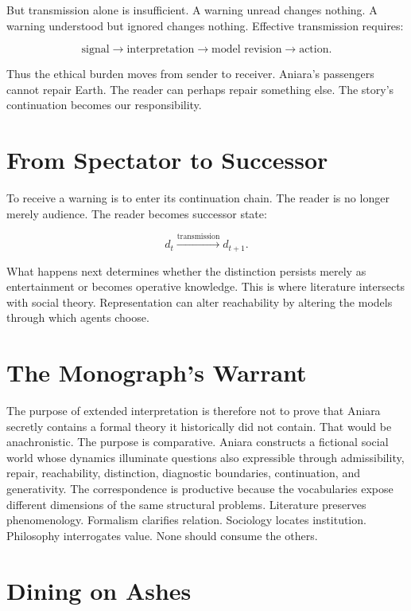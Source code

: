\documentclass[11pt,oneside]{book}
\theoremstyle{definition}
\theoremstyle{remark}
\begin{document}
But transmission alone is insufficient. A warning unread changes nothing. A warning understood but
ignored changes nothing. Effective transmission requires:

\[
\text{signal} \rightarrow \text{interpretation} \rightarrow \text{model revision} \rightarrow \text{action}.
\]

Thus the ethical burden moves from sender to receiver. Aniara's passengers cannot repair Earth. The
reader can perhaps repair something else. The story's continuation becomes our responsibility.

\section{From Spectator to Successor}

To receive a warning is to enter its continuation chain. The reader is no longer merely audience.
The reader becomes successor state:

\[
d_t \xrightarrow{\text{transmission}} d_{t+1}.
\]

What happens next determines whether the distinction persists merely as entertainment or becomes
operative knowledge. This is where literature intersects with social theory. Representation can
alter reachability by altering the models through which agents choose.

\section{The Monograph's Warrant}

The purpose of extended interpretation is therefore not to prove that Aniara secretly contains a
formal theory it historically did not contain. That would be anachronistic. The purpose is
comparative. Aniara constructs a fictional social world whose dynamics illuminate questions also
expressible through admissibility, repair, reachability, distinction, diagnostic boundaries,
continuation, and generativity. The correspondence is productive because the vocabularies expose
different dimensions of the same structural problems. Literature preserves phenomenology. Formalism
clarifies relation. Sociology locates institution. Philosophy interrogates value. None should
consume the others.

\section{Dining on Ashes}
\end{document}
